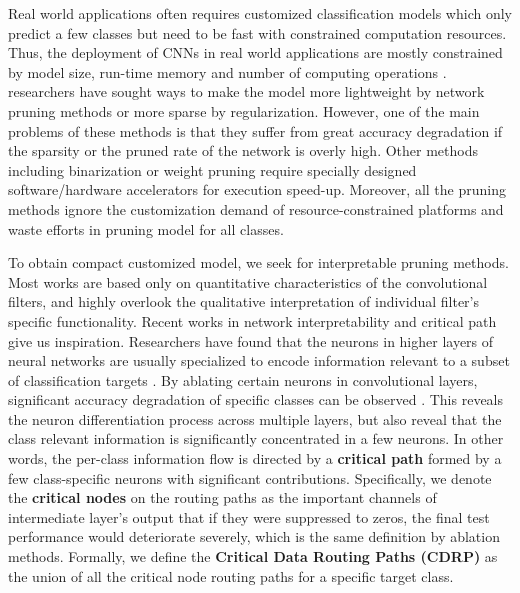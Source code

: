 \documentclass[conference]{IEEEtran}
\begin{document}
Real world applications often requires customized classification models which only predict a few classes but need to be fast with constrained computation resources. Thus, the deployment of CNNs in real world applications are mostly constrained by model size, run-time memory and number of computing operations \cite{liu2017learning}. researchers have sought ways to make the model more lightweight by network pruning methods\cite{reed1993pruning, han2015learning, he2017channel} or more sparse by regularization\cite{collins2014memory, yoon2017combined}. However,
one of the main problems of these methods is that they suffer from great accuracy degradation if the sparsity or the pruned rate of the network is overly high. Other methods including binarization\cite{rastegari2016xnor, courbariaux2017binarynet} or weight pruning \cite{han2015learning} require specially designed software/hardware accelerators for execution speed-up. Moreover, all the pruning methods ignore the customization demand of resource-constrained platforms and waste efforts in pruning model for all classes.

To obtain compact customized model, we seek for interpretable pruning methods. Most works are based only on quantitative characteristics of the convolutional filters, and highly overlook the qualitative interpretation of individual filter’s specific functionality. Recent works in network interpretability\cite{qin2018interpretable} and critical path\cite{Wang_2018_CVPR, yu2018distilling} give us inspiration. Researchers have found that the neurons in higher layers of neural networks are usually specialized to encode information relevant to a subset of classification targets \cite{zhou2018revisiting, morcos2018importance}. By ablating
certain neurons in convolutional layers, significant accuracy degradation of specific classes can be observed \cite{yosinski2015understanding}. This reveals the neuron differentiation process across multiple layers, but also reveal that the class relevant information is significantly concentrated in a few neurons\cite{yu2018distilling}. In other words, the per-class information flow is directed by a \textbf{critical path} formed by a few class-specific neurons with significant contributions. Specifically, we denote the \textbf{critical nodes} on the routing paths as the important channels of intermediate layer's output that if they were suppressed to zeros, the final test performance would deteriorate severely, which is the same definition by ablation methods. Formally, we define the \textbf{Critical Data Routing Paths (CDRP)} as the union of all the critical node routing paths for a specific target class.  
\end{document}
